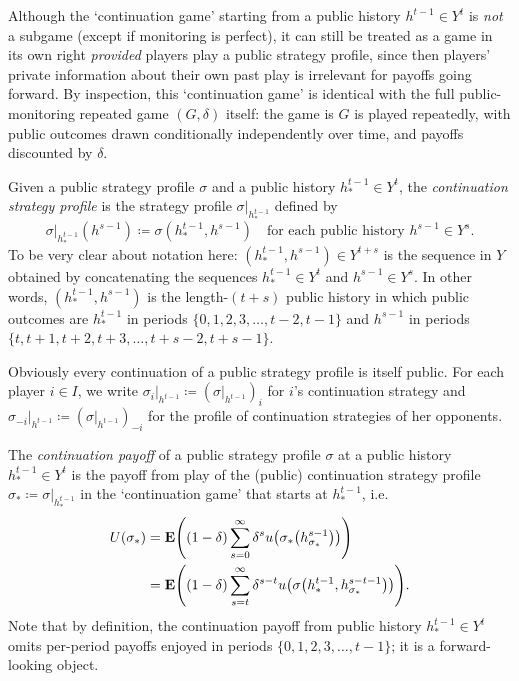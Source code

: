 Although the `continuation game' starting from a public history $h^{t-1} \in Y^t$ is \emph{not} a subgame (except if monitoring is perfect), it can still be treated as a game in its own right \emph{provided} players play a public strategy profile, since then players' private information about their own past play is irrelevant for payoffs going forward. By inspection, this `continuation game' is identical with the full public-monitoring repeated game $(G,\delta)$ itself: the game is $G$ is played repeatedly, with public outcomes drawn conditionally independently over time, and payoffs discounted by $\delta$.

Given a public strategy profile $\sigma$ and a public history $h_{*}^{t-1} \in Y^t$, the \emph{continuation strategy profile} is the strategy profile $\sigma|_{h_{*}^{t-1}}$ defined by
%
\begin{equation*}
	\left.\sigma\right|_{h_{*}^{t-1}}\left( h^{s-1} \right)
	\coloneqq \sigma\left( h_{*}^{t-1}, h^{s-1} \right)
	\quad \text{for each public history $h^{s-1} \in Y^s$.}
\end{equation*}
%
To be very clear about notation here: $(h_{*}^{t-1}, h^{s-1}) \in Y^{t+s}$ is the sequence in $Y$ obtained by concatenating the sequences $h_{*}^{t-1} \in Y^t$ and $h^{s-1} \in Y^s$. In other words, $(h_{*}^{t-1}, h^{s-1})$ is the length-$(t+s)$ public history in which public outcomes are $h_{*}^{t-1}$ in periods $\{0,1,2,3,\dots,t-2,t-1\}$ and $h^{s-1}$ in periods $\{t,t+1,t+2,t+3,\dots,t+s-2,t+s-1\}$.

Obviously every continuation of a public strategy profile is itself public. For each player $i \in I$, we write $\sigma_i|_{h^{t-1}} \coloneqq \left( \sigma|_{h^{t-1}} \right)_i$ for $i$'s continuation strategy and $\sigma_{-i}|_{h^{t-1}} \coloneqq \left( \sigma|_{h^{t-1}} \right)_{-i}$ for the profile of continuation strategies of her opponents.

The \emph{continuation payoff} of a public strategy profile $\sigma$ at a public history $h_{*}^{t-1} \in Y^t$ is the payoff from play of the (public) continuation strategy profile $\sigma_{*} \coloneqq \sigma|_{h_{*}^{t-1}}$ in the `continuation game' that starts at $h_{*}^{t-1}$, i.e.
%
\begin{align*}
	U\left( \sigma_{*} \right)
	&= \E\left( (1-\delta) \sum_{s=0}^\infty \delta^s u\left( \sigma_{*}\left(h^{s-1}_{\sigma_{*}}\right) \right) \right)
	\\
	&= \E\left( (1-\delta) \sum_{s=t}^\infty \delta^{s-t} u\left( \sigma\left(h_{*}^{t-1},h^{s-t-1}_{\sigma_{*}} \right) \right) \right) .
\end{align*}
%
Note that by definition, the continuation payoff from public history $h_{*}^{t-1} \in Y^t$ omits per-period payoffs enjoyed in periods $\{0,1,2,3,\dots,t-1\}$; it is a forward-looking object.

